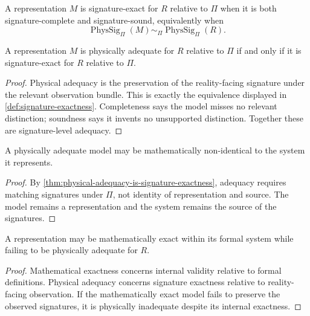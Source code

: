\begin{definition}
\label{def:signature-exactness}
A representation $M$ is signature-exact for $R$ relative to $\Pi$ when it is both signature-complete and signature-sound, equivalently when
$$
\operatorname{PhysSig}_{\Pi}(M)
\sim_{\Pi}
\operatorname{PhysSig}_{\Pi}(R).
$$
\end{definition}

\begin{theorem}
\label{thm:physical-adequacy-is-signature-exactness}
A representation $M$ is physically adequate for $R$ relative to $\Pi$ if and only if it is signature-exact for $R$ relative to $\Pi$.
\end{theorem}

\begin{proof}
Physical adequacy is the preservation of the reality-facing signature under the relevant observation bundle. This is exactly the equivalence displayed in \autoref{def:signature-exactness}. Completeness says the model misses no relevant distinction; soundness says it invents no unsupported distinction. Together these are signature-level adequacy.
\end{proof}

\begin{corollary}
\label{cor:adequacy-does-not-collapse-representation}
A physically adequate model may be mathematically non-identical to the system it represents.
\end{corollary}

\begin{proof}
By \autoref{thm:physical-adequacy-is-signature-exactness}, adequacy requires matching signatures under $\Pi$, not identity of representation and source. The model remains a representation and the system remains the source of the signatures.
\end{proof}

\begin{corollary}
\label{cor:mathematical-exactness-physically-inadequate}
A representation may be mathematically exact within its formal system while failing to be physically adequate for $R$.
\end{corollary}

\begin{proof}
Mathematical exactness concerns internal validity relative to formal definitions. Physical adequacy concerns signature exactness relative to reality-facing observation. If the mathematically exact model fails to preserve the observed signatures, it is physically inadequate despite its internal exactness.
\end{proof}

